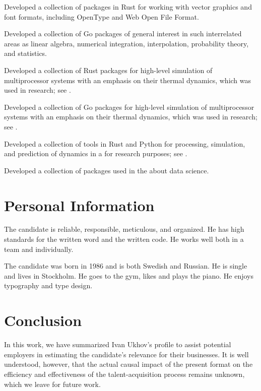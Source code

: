 \documentclass[journal]{IEEEtran}
\begin{document}
\emph{} Developed
a collection of packages in Rust for working with vector graphics and font
formats, including OpenType and Web Open File Format.

\emph{} Developed a collection of Go packages of general interest in such
interrelated areas as linear algebra, numerical integration, interpolation,
probability theory, and statistics.

\emph{} Developed a collection of Rust packages for high-level simulation of
multiprocessor systems with an emphasis on their thermal dynamics, which was
used in research; see .

\emph{} Developed a collection of Go packages for
high-level simulation of multiprocessor systems with an emphasis on their
thermal dynamics, which was used in research; see .

\emph{} Developed a collection of tools in Rust and
Python for processing, simulation, and prediction of dynamics in a
 for research
purposes; see .

\emph{} Developed a collection of packages used in the
 about data science.

\section{Personal Information} 

The candidate is reliable, responsible, meticulous, and organized. He has high
standards for the written word and the written code. He works well both in a
team and individually.

The candidate was born in 1986 and is both Swedish and Russian. He is single and
lives in Stockholm. He goes to the gym, likes
 and plays the
piano. He enjoys typography and type design.

\section{Conclusion} 

In this work, we have summarized Ivan Ukhov's profile to assist potential
employers in estimating the candidate's relevance for their businesses. It is
well understood, however, that the actual causal impact of the present format on
the efficiency and effectiveness of the talent-acquisition process remains
unknown, which we leave for future work.

\begingroup
  
  
\endgroup
\end{document}
